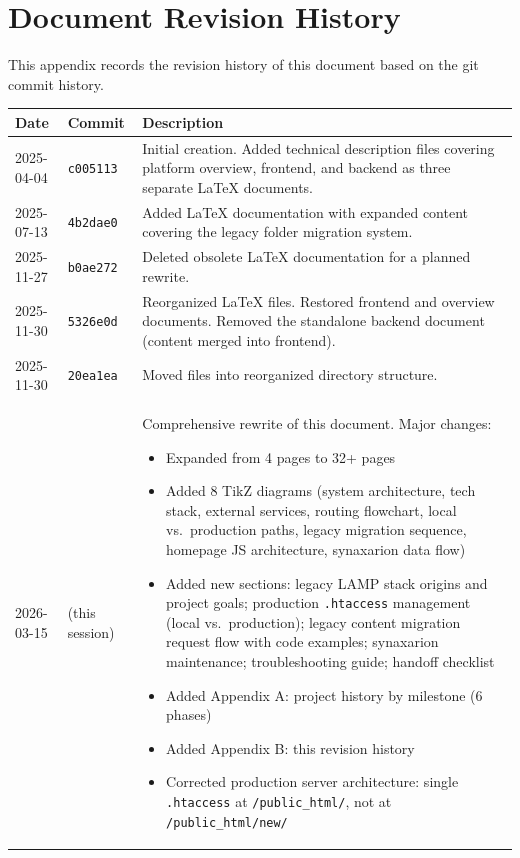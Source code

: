 \documentclass[12pt]{article}
\begin{document}
\section{Document Revision History}
\label{app:revisions}

This appendix records the revision history of this document based on the git commit history.

\begin{longtable}{p{2cm}p{2.5cm}p{8cm}}
\toprule
\textbf{Date} & \textbf{Commit} & \textbf{Description} \\
\midrule
2025-04-04 & \texttt{c005113} & Initial creation. Added technical description files covering platform overview, frontend, and backend as three separate LaTeX documents. \\
\midrule
2025-07-13 & \texttt{4b2dae0} & Added LaTeX documentation with expanded content covering the legacy folder migration system. \\
\midrule
2025-11-27 & \texttt{b0ae272} & Deleted obsolete LaTeX documentation for a planned rewrite. \\
\midrule
2025-11-30 & \texttt{5326e0d} & Reorganized LaTeX files. Restored frontend and overview documents. Removed the standalone backend document (content merged into frontend). \\
\midrule
2025-11-30 & \texttt{20ea1ea} & Moved files into reorganized directory structure. \\
\midrule
2026-03-15 & (this session) & Comprehensive rewrite of this document. Major changes:
\begin{itemize}[nosep,leftmargin=*]
    \item Expanded from 4 pages to 32+ pages
    \item Added 8 TikZ diagrams (system architecture, tech stack, external services, routing flowchart, local vs.\ production paths, legacy migration sequence, homepage JS architecture, synaxarion data flow)
    \item Added new sections: legacy LAMP stack origins and project goals; production \texttt{.htaccess} management (local vs.\ production); legacy content migration request flow with code examples; synaxarion maintenance; troubleshooting guide; handoff checklist
    \item Added Appendix A: project history by milestone (6 phases)
    \item Added Appendix B: this revision history
    \item Corrected production server architecture: single \texttt{.htaccess} at \texttt{/public\_html/}, not at \texttt{/public\_html/new/}

\end{itemize}
\end{longtable}
\end{document}
